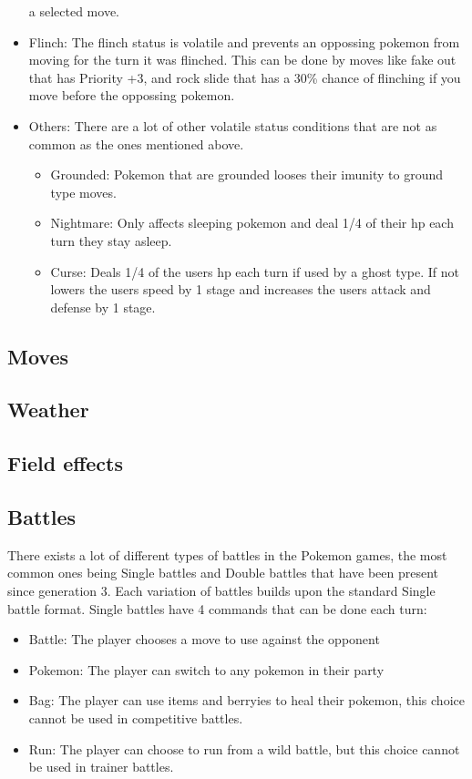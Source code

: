 \begin{itemize}
    a selected move.
  \item Flinch: The flinch status is volatile and prevents an oppossing pokemon from moving for the turn it was flinched. This can be done by moves like 
    fake out that has Priority +3, and rock slide that has a 30\% chance of flinching if you move before the oppossing pokemon.
  \item Others: There are a lot of other volatile status conditions that are not as common as the ones mentioned above.
  \begin{itemize}
    \item Grounded: Pokemon that are grounded looses their imunity to ground type moves.
    \item Nightmare: Only affects sleeping pokemon and deal 1/4 of their hp each turn they stay asleep.
    \item Curse: Deals 1/4 of the users hp each turn if used by a ghost type. If not lowers the users speed by 1 stage and increases 
      the users attack and defense by 1 stage.
  \end{itemize}
\end{itemize}
\subsection{Moves}
\subsection{Weather}
\subsection{Field effects}
\subsection{Battles}
There exists a lot of different types of battles in the Pokemon games, the most common ones being Single battles and Double battles that have been present 
since generation 3. Each variation of battles builds upon the standard Single battle format. Single battles have 4 commands that can be done each turn:
\cite{PokemonBattles}
\begin{itemize}
  \item Battle: The player chooses a move to use against the opponent
  \item Pokemon: The player can switch to any pokemon in their party 
  \item Bag: The player can use items and berryies to heal their pokemon, this choice cannot be used in competitive battles.
  \item Run: The player can choose to run from a wild battle, but this choice cannot be used in trainer battles.
\end{itemize}
